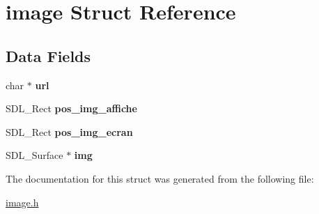 \hypertarget{structimage}{}\section{image Struct Reference}
\label{structimage}
\subsection*{Data Fields}
\begin{DoxyCompactItemize}
\item 
\mbox{\label{structimage_afff0b667f990ebc4d36da4001c3b61d9}} 
char $\ast$ {\bfseries url}
\item 
\mbox{\label{structimage_a1d7c4c377c566638a1b0314ef80abcc6}} 
S\+D\+L\+\_\+\+Rect {\bfseries pos\+\_\+img\+\_\+affiche}
\item 
\mbox{\label{structimage_a5da4718d620337efa32aee2012755239}} 
S\+D\+L\+\_\+\+Rect {\bfseries pos\+\_\+img\+\_\+ecran}
\item 
\mbox{\label{structimage_a27c5d076eb3f7ede915b271bf8b3a695}} 
S\+D\+L\+\_\+\+Surface $\ast$ {\bfseries img}
\end{DoxyCompactItemize}


The documentation for this struct was generated from the following file\+:\begin{DoxyCompactItemize}
\item 
\hyperlink{image_8h}{image.\+h}\end{DoxyCompactItemize}
